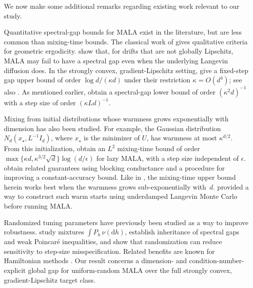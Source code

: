 \documentclass[11pt]{article}
\newcommand{\1}{\mathbf 1}
\newcommand{\df}{\mathrm{d}}
\begin{document}
	We now make some additional remarks regarding existing work relevant to our study.
	
	Quantitative spectral-gap bounds for MALA exist in the literature, but are less common than
	mixing-time bounds. 
	The classical work of \citet{RobertsTweedie1996}
	gives qualitative criteria for geometric ergodicity.
	\citet{BouRabeeHairer2013} show that, for drifts that are not globally
	Lipschitz, MALA may fail to have a spectral gap even when the underlying
	Langevin diffusion does. In the strongly convex, gradient-Lipschitz
	setting, \citet[Theorem~2]{LeeShenTian2021} give a fixed-step gap upper
	bound of order $\log d/(\kappa d)$ under their restriction
	$\kappa=O(d^4)$;
	see also \cite{ChewiEtAl2021,WuSchmidlerChen2022}.
	As mentioned earlier, \citet{LiuTong2026} obtain a spectral-gap
	lower bound of order $(\kappa^2d)^{-1}$ with a step size of order
	$(\kappa Ld)^{-1}$. 
	
	
	Mixing from initial distributions whose warmness grows exponentially
	with dimension has also been studied. For example, the Gaussian
	distribution $N_d(x_\star,L^{-1}I_d)$, where $x_\star$ is the minimizer
	of $U$, has warmness at most $\kappa^{d/2}$.
	From this initialization, \citet[Theorem~5]{ChenDwivediWainwrightYu2020}
	obtain an $L^2$ mixing-time bound of order
	$\max\{\kappa d,\kappa^{3/2}\sqrt d\}\log(d/\epsilon)$ for lazy MALA,
	with a step size independent of $\epsilon$.
	 obtain related guarantees using blocking
	conductance and a procedure for improving a constant-accuracy bound.
	Like in \cite{ChewiEtAl2021,WuSchmidlerChen2022}, the mixing-time upper bound herein works best when the warmness grows sub-exponentially with~$d$.
	 provided a way to construct such warm starts using underdamped
	Langevin Monte Carlo before running MALA. 
	
	
	
	
	Randomized tuning parameters have previously been studied as a way to
	improve robustness.  study
	mixtures $\int P_h\,\nu(\df h)$, establish inheritance of spectral gaps
	and weak Poincar\'e inequalities, and show that randomization can reduce
	sensitivity to step-size misspecification. Related benefits are known
	for Hamiltonian methods
	\citep{BouRabeeSanzSerna2017,ApersGriblingSzilagyi2024}.
	Our result concerns a dimension- and condition-number-explicit global
	gap for uniform-random MALA over the full strongly convex,
	gradient-Lipschitz target class.
	
\end{document}
